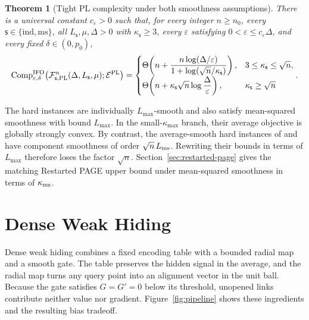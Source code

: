 \documentclass{article}
\newtheorem{theorem}{Theorem}[section]
\theoremstyle{definition}
\begin{document}
\begin{theorem}[Tight PL complexity under both smoothness assumptions]
\label{thm:pl-main}
There is a universal constant $c_\varepsilon>0$ such that,
for every integer $n\ge n_0$, every $\mathsf s\in\{\mathrm{ind},\mathrm{ms}\}$,
all $L_{\mathsf s},\mu,\Delta>0$ with $\kappa_{\mathsf s}\ge3$, every
$\varepsilon$ satisfying $0<\varepsilon\le c_\varepsilon\Delta$, and every
fixed $\delta\in(0,p_0)$,
\begin{equation}
 \operatorname{Comp}_{\varepsilon,\delta}^{\rm IFO}
 \bigl(\mathcal F_{\mathsf s,\rm PL}^n(\Delta,L_{\mathsf s},\mu);
 \mathcal E^{\rm PL}\bigr)
 =
 \begin{cases}
 \displaystyle
 \Theta\!\left(n+
 \frac{n\log(\Delta/\varepsilon)}
 {1+\log(\sqrt n/\kappa_{\mathsf s})}\right),
 &3\le\kappa_{\mathsf s}\le\sqrt n,\\[2mm]
 \displaystyle
 \Theta\!\left(n+
 \kappa_{\mathsf s}\sqrt n\log\frac{\Delta}{\varepsilon}\right),
 &\kappa_{\mathsf s}\ge\sqrt n
 \end{cases}
 .
 \label{eq:tight-pl-complexity}
\end{equation}
\end{theorem}

The hard instances are individually $L_{\max}$-smooth and also satisfy
mean-squared smoothness with bound $L_{\max}$.  In the
small-$\kappa_{\max}$ branch, their average
objective is globally strongly convex.  By contrast, the average-smooth hard
instances of \citet{zhou2019lower} and \citet{han2024lower} have component
smoothness of order $\sqrt n\,L_{\rm ms}$.  Rewriting their bounds in terms of
$L_{\max}$ therefore loses the factor $\sqrt n$.  Section~\ref{sec:restarted-page}
gives the matching Restarted PAGE upper bound under mean-squared smoothness in
terms of $\kappa_{\rm ms}$.

\section{Dense Weak Hiding}
\label{sec:construction}

Dense weak hiding combines a fixed encoding table with a bounded radial map
and a smooth gate.  The table preserves the hidden signal in the average, and
the radial map turns any query point into an alignment vector in the unit ball.
Because the gate satisfies $G=G'=0$ below its threshold, unopened links
contribute neither value nor gradient.  Figure~\ref{fig:pipeline} shows these
ingredients and the resulting bias tradeoff.
\end{document}
